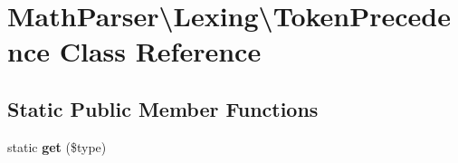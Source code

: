 \hypertarget{classMathParser_1_1Lexing_1_1TokenPrecedence}{\section{Math\-Parser\textbackslash{}Lexing\textbackslash{}Token\-Precedence Class Reference}
\label{classMathParser_1_1Lexing_1_1TokenPrecedence}
}
\subsection*{Static Public Member Functions}
\begin{DoxyCompactItemize}
\item 
\hypertarget{classMathParser_1_1Lexing_1_1TokenPrecedence_a1df0dfad03e91f649a2aba049ba8c815}{static {\bfseries get} (\$type)}\label{classMathParser_1_1Lexing_1_1TokenPrecedence_a1df0dfad03e91f649a2aba049ba8c815}

\end{DoxyCompactItemize}
